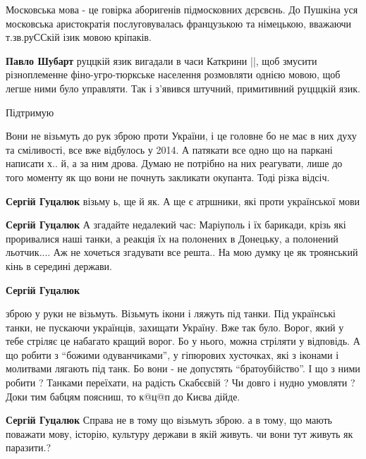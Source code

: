 \begin{itemize}

Московська мова - це говірка аборигенів підмосковних дєрєвєнь. До Пушкіна уся
московська аристократія послуговувалась французькою та німецькою, вважаючи
т.зв.руССкій ізик мовою кріпаків.

\begin{itemize} %
\textbf{Павло Шубарт} руццкій язик вигадали в часи Каткрини ||, щоб змусити різноплеменне фіно-угро-тюркське населення розмовляти однією мовою, щоб легше ними було управляти. Так і з'явився штучний, примитивний руцццкій язик.
\end{itemize} %

Підтримую


Вони не візьмуть до рук зброю проти України, і це головне бо не має в них духу
та сміливості, все вже відбулось у 2014. А патякати все одно що на паркані
написати х.. й, а за ним дрова. Думаю не потрібно на них реагувати, лише до
того моменту як що вони не почнуть закликати окупанта. Тоді різка відсіч.

\begin{itemize} %
\textbf{Сергій Гуцалюк} візьму ь, ще й як. А ще є атршники, які проти української мови

\textbf{Сергій Гуцалюк} А згадайте недалекий час: Маріуполь і їх барикади, крізь які проривалися наші танки, а реакція їх на полонених в Донецьку, а полонений льотчик.... Аж не хочеться згадувати все решта.. На мою думку це як троянський кінь в середині держави.

\textbf{Сергій Гуцалюк} 

зброю у руки не візьмуть. Візьмуть ікони і ляжуть під танки. Під українські
танки, не пускаючи українців, захищати Україну. Вже так було. Ворог, який у
тебе стріляє це набагато кращий ворог. Бо у нього, можна стріляти у відповідь.
А що робити з \enquote{божими одуванчиками}, у гіпюрових хусточках, які з іконами і
молитвами лягають під танк. Бо вони - не допустять \enquote{братоубійство}. І що з ними
робити ? Танками переїхати, на радість Скабєєвій ? Чи довго і нудно умовляти ?
Доки тим бабцям поясниш, то к@ц@п до Києва дійде.

\textbf{Сергій Гуцалюк} Справа не в тому що візьмуть зброю. а в тому, що мають поважати мову, історію, культуру держави в якій живуть. чи вони тут живуть як паразити.?
\end{itemize} %


\end{itemize}
